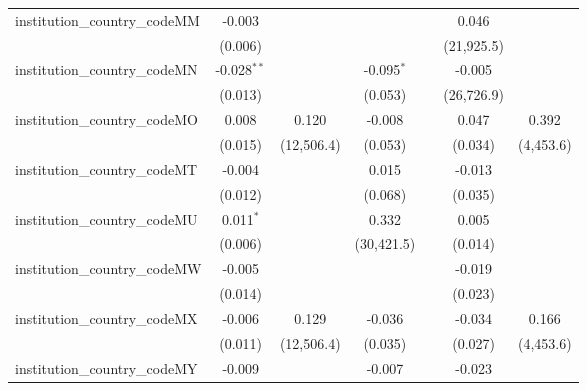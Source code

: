 \begin{tabular}{lcccccc}
   institution\_country\_codeMM          & -0.003         &               &               &               & 0.046         &   \\   
                                         & (0.006)        &               &               &               & (21,925.5)    &   \\   
   institution\_country\_codeMN          & -0.028$^{**}$  &               & -0.095$^{*}$  &               & -0.005        &   \\   
                                         & (0.013)        &               & (0.053)       &               & (26,726.9)    &   \\   
   institution\_country\_codeMO          & 0.008          & 0.120         & -0.008        &               & 0.047         & 0.392\\   
                                         & (0.015)        & (12,506.4)    & (0.053)       &               & (0.034)       & (4,453.6)\\   
   institution\_country\_codeMT          & -0.004         &               & 0.015         &               & -0.013        &   \\   
                                         & (0.012)        &               & (0.068)       &               & (0.035)       &   \\   
   institution\_country\_codeMU          & 0.011$^{*}$    &               & 0.332         &               & 0.005         &   \\   
                                         & (0.006)        &               & (30,421.5)    &               & (0.014)       &   \\   
   institution\_country\_codeMW          & -0.005         &               &               &               & -0.019        &   \\   
                                         & (0.014)        &               &               &               & (0.023)       &   \\   
   institution\_country\_codeMX          & -0.006         & 0.129         & -0.036        &               & -0.034        & 0.166\\   
                                         & (0.011)        & (12,506.4)    & (0.035)       &               & (0.027)       & (4,453.6)\\   
   institution\_country\_codeMY          & -0.009         &               & -0.007        &               & -0.023        &   \\   

\end{tabular}
